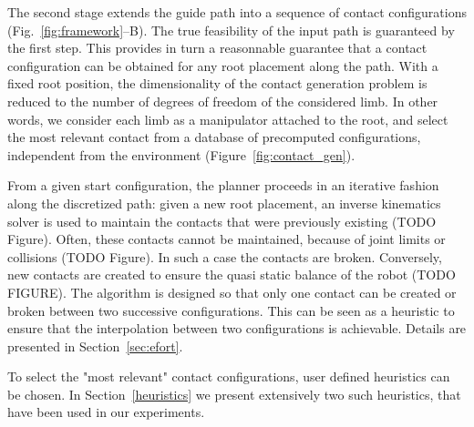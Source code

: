 The second stage extends the guide path into a sequence of contact configurations (Fig.~\ref{fig:framework}--B). The true feasibility of the input path is guaranteed by the first step.
This provides in turn a reasonnable guarantee that a contact configuration can be obtained for any root placement along the path. With a fixed root position, the dimensionality of the 
contact generation problem is reduced to the number of degrees of freedom of the considered limb. In other words, we consider each limb as a manipulator attached to the root, and select the most relevant contact from a database of precomputed configurations, independent from the environment (Figure~\ref{fig:contact_gen}).

From a given start configuration, the planner proceeds in an iterative fashion along the discretized path: given a new root placement, an inverse kinematics solver 
is used to maintain the contacts that were previously existing (TODO Figure). Often, these contacts cannot be maintained, because of joint limits or collisions (TODO Figure).
In such a case the contacts are broken. Conversely, new contacts are created to ensure the quasi static balance of the robot (TODO FIGURE).
The algorithm is designed so that only one contact can be created or broken between two successive configurations. This can be seen as a heuristic to ensure
that the interpolation between two configurations is achievable.
Details are presented in Section~\ref{sec:efort}. 

To select the "most relevant" contact configurations, user defined heuristics can be chosen. In Section~\ref{heuristics} we present extensively two such heuristics, that have been
used in our experiments.



